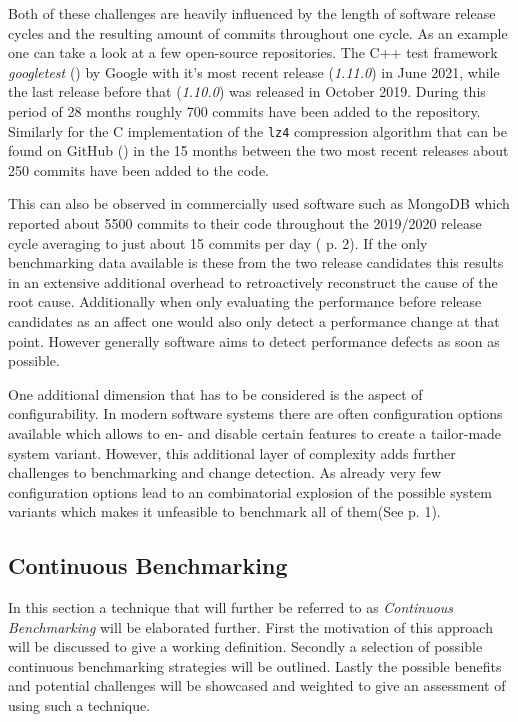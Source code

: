 \documentclass[	runningheads,
				a4paper]{llncs}
\begin{document}
	Both of these challenges are heavily influenced by the length of software release cycles and the resulting amount of commits throughout one cycle. As an example one can take a look at a few open-source repositories. The C++ test framework \textit{googletest} (\cite{gtest}) by Google with it's most recent release (\textit{1.11.0}) in June 2021, while the last release before that (\textit{1.10.0}) was released in October 2019. During this period of 28 months roughly 700 commits have been added to the repository. Similarly for the C implementation of the \texttt{lz4} compression algorithm that can be found on GitHub (\cite{gitlz4}) in the 15 months between the two most recent releases about 250 commits have been added to the code.

	This can also be observed in commercially used software such as MongoDB which reported about 5500 commits to their code throughout the 2019/2020 release cycle averaging to just about 15 commits per day (\cite{daly2021} p. 2). If the only benchmarking data available is these from the two release candidates this results in an extensive additional overhead to retroactively reconstruct the cause of the root cause. Additionally when only evaluating the performance before release candidates as an affect one would also only detect a performance change at that point. However generally software aims to detect performance defects as soon as possible. 

	One additional dimension that has to be considered is the aspect of configurability. In modern software systems there are often configuration options available which allows to en- and disable certain features to create a tailor-made system variant. However, this additional layer of complexity adds further challenges to benchmarking and change detection. As already very few configuration options lead to an combinatorial explosion of the possible system variants which makes it unfeasible to benchmark all of them(See \cite{apel2020} p. 1).

	\subsection{Continuous Benchmarking}
In this section a technique that will further be referred to as \textit{Continuous Benchmarking} will be elaborated further. First the motivation of this approach will be discussed to give a working definition. Secondly a selection of possible continuous benchmarking strategies will be outlined. Lastly the possible benefits and potential challenges will be showcased and weighted to give an assessment of using such a technique.
\end{document}
